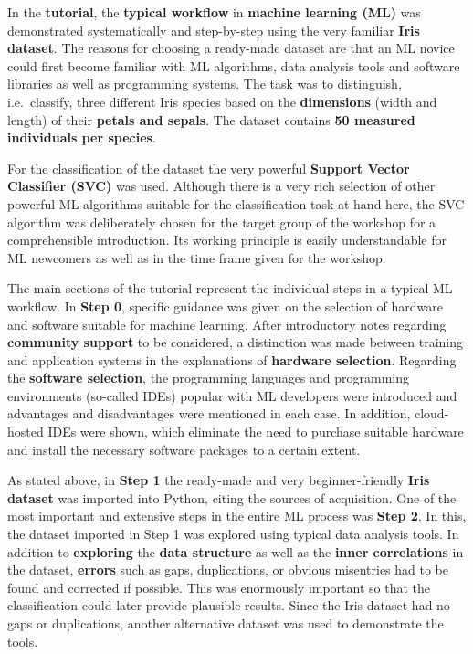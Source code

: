 \documentclass [oneside,10pt,a4paper,ngerman,BCOR10mm,headsepline,parindent,final]{scrartcl}
\begin{document}
In the \textbf{tutorial}, the \textbf{typical workflow} in
\textbf{machine learning (ML)} was demonstrated systematically and
step-by-step using the very familiar \textbf{Iris dataset}. The reasons
for choosing a ready-made dataset are that an ML novice could first
become familiar with ML algorithms, data analysis tools and software
libraries as well as programming systems. The task was to distinguish,
i.e.~classify, three different Iris species based on the
\textbf{dimensions} (width and length) of their \textbf{petals and
sepals}. The dataset contains \textbf{50 measured individuals per
species}.

For the classification of the dataset the very powerful \textbf{Support
Vector Classifier (SVC)} was used. Although there is a very rich
selection of other powerful ML algorithms suitable for the
classification task at hand here, the SVC algorithm was deliberately
chosen for the target group of the workshop for a comprehensible
introduction. Its working principle is easily understandable for ML
newcomers as well as in the time frame given for the workshop.

The main sections of the tutorial represent the individual steps in a
typical ML workflow. In \textbf{Step 0}, specific guidance was given on
the selection of hardware and software suitable for machine learning.
After introductory notes regarding \textbf{community support} to be
considered, a distinction was made between training and application
systems in the explanations of \textbf{hardware selection}. Regarding
the \textbf{software selection}, the programming languages and
programming environments (so-called IDEs) popular with ML developers
were introduced and advantages and disadvantages were mentioned in each
case. In addition, cloud-hosted IDEs were shown, which eliminate the
need to purchase suitable hardware and install the necessary software
packages to a certain extent.

As stated above, in \textbf{Step 1} the ready-made and very
beginner-friendly \textbf{Iris dataset} was imported into Python, citing
the sources of acquisition. One of the most important and extensive
steps in the entire ML process was \textbf{Step 2}. In this, the dataset
imported in Step 1 was explored using typical data analysis tools. In
addition to \textbf{exploring} the \textbf{data structure} as well as
the \textbf{inner correlations} in the dataset, \textbf{errors} such as
gaps, duplications, or obvious misentries had to be found and corrected
if possible. This was enormously important so that the classification
could later provide plausible results. Since the Iris dataset had no
gaps or duplications, another alternative dataset was used to
demonstrate the tools.
\end{document}
